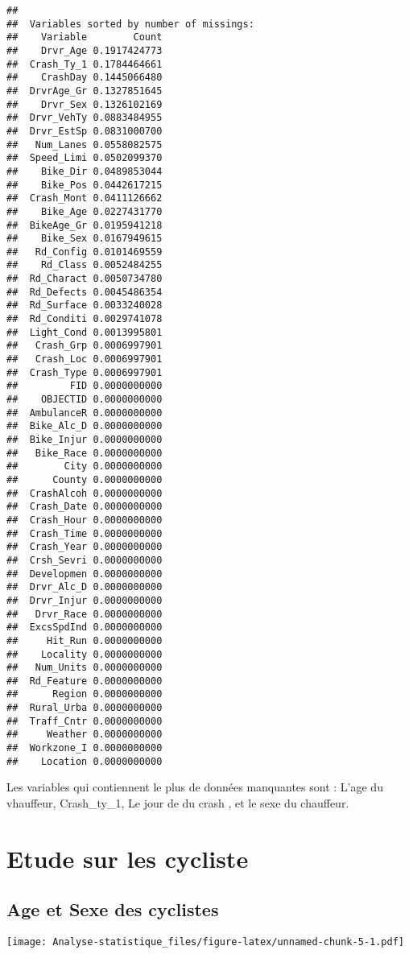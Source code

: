 \documentclass[
  french,
]{article}
\begin{document}
\begin{verbatim}
## 
##  Variables sorted by number of missings: 
##    Variable        Count
##    Drvr_Age 0.1917424773
##  Crash_Ty_1 0.1784464661
##    CrashDay 0.1445066480
##  DrvrAge_Gr 0.1327851645
##    Drvr_Sex 0.1326102169
##  Drvr_VehTy 0.0883484955
##  Drvr_EstSp 0.0831000700
##   Num_Lanes 0.0558082575
##  Speed_Limi 0.0502099370
##    Bike_Dir 0.0489853044
##    Bike_Pos 0.0442617215
##  Crash_Mont 0.0411126662
##    Bike_Age 0.0227431770
##  BikeAge_Gr 0.0195941218
##    Bike_Sex 0.0167949615
##   Rd_Config 0.0101469559
##    Rd_Class 0.0052484255
##  Rd_Charact 0.0050734780
##  Rd_Defects 0.0045486354
##  Rd_Surface 0.0033240028
##  Rd_Conditi 0.0029741078
##  Light_Cond 0.0013995801
##   Crash_Grp 0.0006997901
##   Crash_Loc 0.0006997901
##  Crash_Type 0.0006997901
##         FID 0.0000000000
##    OBJECTID 0.0000000000
##  AmbulanceR 0.0000000000
##  Bike_Alc_D 0.0000000000
##  Bike_Injur 0.0000000000
##   Bike_Race 0.0000000000
##        City 0.0000000000
##      County 0.0000000000
##  CrashAlcoh 0.0000000000
##  Crash_Date 0.0000000000
##  Crash_Hour 0.0000000000
##  Crash_Time 0.0000000000
##  Crash_Year 0.0000000000
##  Crsh_Sevri 0.0000000000
##  Developmen 0.0000000000
##  Drvr_Alc_D 0.0000000000
##  Drvr_Injur 0.0000000000
##   Drvr_Race 0.0000000000
##  ExcsSpdInd 0.0000000000
##     Hit_Run 0.0000000000
##    Locality 0.0000000000
##   Num_Units 0.0000000000
##  Rd_Feature 0.0000000000
##      Region 0.0000000000
##  Rural_Urba 0.0000000000
##  Traff_Cntr 0.0000000000
##     Weather 0.0000000000
##  Workzone_I 0.0000000000
##    Location 0.0000000000
\end{verbatim}

Les variables qui contiennent le plus de données manquantes sont : L'age
du vhauffeur, Crash\_ty\_1, Le jour de du crash , et le sexe du
chauffeur.

\hypertarget{etude-sur-les-cycliste}{%
\section{Etude sur les cycliste}\label{etude-sur-les-cycliste}}

\hypertarget{age-et-sexe-des-cyclistes}{%
\subsection{Age et Sexe des cyclistes}\label{age-et-sexe-des-cyclistes}}

\texttt{[image: Analyse-statistique\_files/figure-latex/unnamed-chunk-5-1.pdf]}
\end{document}
